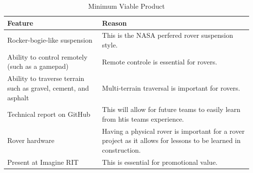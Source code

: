 \documentclass[conference]{IEEEtran} %
\begin{document}
\begin{table}[hb!]
    \caption{Minimum Viable Product}
    \centering
    {\renewcommand{\arraystretch}{1.2}
    \begin{tabularx}{\linewidth}{LL} 
    \hline
    \textbf{Feature} & \textbf{Reason} \\
    \hline
    Rocker-bogie-like suspension & This is the NASA perfered rover suspension style. \\
    \hline
    Ability to control remotely (such as a gamepad) & Remote controle is essential for rovers. \\
    \hline
    Ability to traverse terrain such as gravel, cement, and asphalt & Multi-terrain traversal is important for rovers. \\
    \hline
    Technical report on GitHub & This will allow for future teams to easily learn from htis teams experience. \\
    \hline
    Rover hardware & Having a physical rover is important for a rover project as it allows for lessons to be learned in construction. \\ 
    \hline
    Present at Imagine RIT & This is essential for promotional value. \\
    \hline
    \end{tabularx}
    }
\label{tab:mvp-one}
\end{table}
\end{document}
